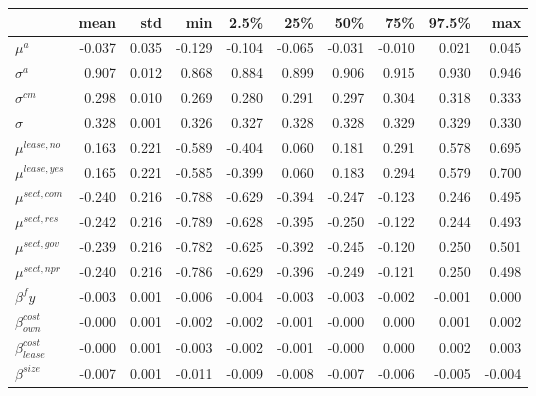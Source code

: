 \begin{tabular}{lrrrrrrrrr}
\toprule
{} &    mean &    std &     min &    2.5\% &     25\% &     50\% &     75\% &   97.5\% &     max \\
\midrule
$\mu^a$      & -0.037 & 0.035 & -0.129 & -0.104 & -0.065 & -0.031 & -0.010 &  0.021 &  0.045 \\
$\sigma^a$   &  0.907 & 0.012 &  0.868 &  0.884 &  0.899 &  0.906 &  0.915 &  0.930 &  0.946 \\
$\sigma^{cm} $    &  0.298 & 0.010 &  0.269 &  0.280 &  0.291 &  0.297 &  0.304 &  0.318 &  0.333 \\
$\sigma$      &  0.328 & 0.001 &  0.326 &  0.327 &  0.328 &  0.328 &  0.329 &  0.329 &  0.330 \\
$\mu^{lease, no} $  &  0.163 & 0.221 & -0.589 & -0.404 &  0.060 &  0.181 &  0.291 &  0.578 &  0.695 \\
$\mu^{lease, yes}$  &  0.165 & 0.221 & -0.585 & -0.399 &  0.060 &  0.183 &  0.294 &  0.579 &  0.700 \\
$\mu^{sect, com}$      & -0.240 & 0.216 & -0.788 & -0.629 & -0.394 & -0.247 & -0.123 &  0.246 &  0.495 \\
$\mu^{sect, res} $       & -0.242 & 0.216 & -0.789 & -0.628 & -0.395 & -0.250 & -0.122 &  0.244 &  0.493 \\
$\mu^{sect, gov} $       & -0.239 & 0.216 & -0.782 & -0.625 & -0.392 & -0.245 & -0.120 &  0.250 &  0.501 \\
$\mu^{sect, npr}$       & -0.240 & 0.216 & -0.786 & -0.629 & -0.396 & -0.249 & -0.121 &  0.250 &  0.498 \\
$\beta^fy$   & -0.003 & 0.001 & -0.006 & -0.004 & -0.003 & -0.003 & -0.002 & -0.001 &  0.000 \\
$\beta_{own}^{cost}$ & -0.000 & 0.001 & -0.002 & -0.002 & -0.001 & -0.000 &  0.000 &  0.001 &  0.002 \\
$\beta_{lease}^{cost}$ & -0.000 & 0.001 & -0.003 & -0.002 & -0.001 & -0.000 &  0.000 &  0.002 &  0.003 \\
$\beta^{size}$ & -0.007 & 0.001 & -0.011 & -0.009 & -0.008 & -0.007 & -0.006 & -0.005 & -0.004 \\
\bottomrule
\end{tabular}
